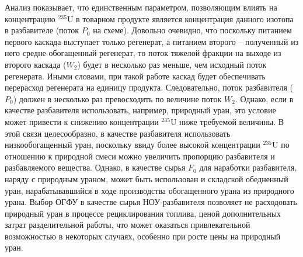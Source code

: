 Анализ показывает, что единственным параметром, позволяющим влиять на концентрацию $^{235}$U в товарном продукте является концентрация данного изотопа в разбавителе (поток $P_{0}$ на схеме). Довольно очевидно, что поскольку питанием первого каскада выступает только регенерат, а питанием второго -- полученный из него средне-обогащенный регенерат, то поток тяжелой фракции на выходе из второго каскада ($W_2$) будет в несколько раз меньше, чем исходный поток регенерата. Иными словами, при такой работе каскад будет обеспечивать перерасход регенерата на единицу продукта. Следовательно, поток разбавителя ($P_{0}$) должен в несколько раз превосходить по величине поток $W_2$. Однако, если в качестве разбавителя использовать, например, природный уран, это условие может привести к снижению концентрации $^{235}$U ниже требуемой величины. В этой связи целесообразно, в качестве разбавителя использовать низкообогащенный уран, поскольку ввиду более высокой концентрации $^{235}$U по отношению к природной смеси можно увеличить пропорцию разбавителя и разбавляемого вещества. Однако, в качестве сырья $F_0$ для наработки разбавителя, наряду с природным ураном, может быть использован и складской обедненный уран, нарабатывавшийся в ходе производства обогащенного урана из природного урана. Выбор ОГФУ в качестве сырья НОУ-разбавителя позволяет не расходовать природный уран в процессе рециклирования топлива, ценой дополнительных затрат разделительной работы, что может оказаться привлекательной возможностью в некоторых случаях, особенно при росте цены на природный уран.




